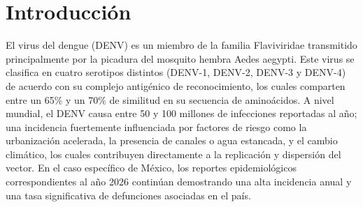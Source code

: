 \titleformat{\chapter}[display]
  {\normalfont\bfseries}{}{0pt}{\Large} %
\chapter{Introducción}
El virus del dengue (DENV) es un miembro de la familia Flaviviridae transmitido principalmente por la picadura del mosquito hembra Aedes aegypti. Este virus se clasifica en cuatro serotipos distintos (DENV-1, DENV-2, DENV-3 y DENV-4) de acuerdo con su complejo antigénico de reconocimiento, los cuales comparten entre un 65\% y un 70\% de similitud en su secuencia de aminoácidos. A nivel mundial, el DENV causa entre 50 y 100 millones de infecciones reportadas al año; una incidencia fuertemente influenciada por factores de riesgo como la urbanización acelerada, la presencia de canales o agua estancada, y el cambio climático, los cuales contribuyen directamente a la replicación y dispersión del vector. En el caso específico de México, los reportes epidemiológicos correspondientes al año 2026 continúan demostrando una alta incidencia anual y una tasa significativa de defunciones asociadas en el país.
